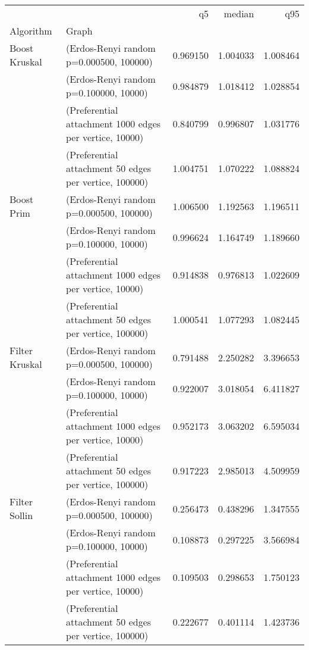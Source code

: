 \begin{tabular}{llrrr}
\toprule
                    &                                                        &        q5 &    median &       q95 \\
Algorithm & Graph &           &           &           \\
\midrule
Boost Kruskal & (Erdos-Renyi random p=0.000500, 100000) &  0.969150 &  1.004033 &  1.008464 \\
                    & (Erdos-Renyi random p=0.100000, 10000) &  0.984879 &  1.018412 &  1.028854 \\
                    & (Preferential attachment 1000 edges per vertice, 10000) &  0.840799 &  0.996807 &  1.031776 \\
                    & (Preferential attachment 50 edges per vertice, 100000) &  1.004751 &  1.070222 &  1.088824 \\
Boost Prim & (Erdos-Renyi random p=0.000500, 100000) &  1.006500 &  1.192563 &  1.196511 \\
                    & (Erdos-Renyi random p=0.100000, 10000) &  0.996624 &  1.164749 &  1.189660 \\
                    & (Preferential attachment 1000 edges per vertice, 10000) &  0.914838 &  0.976813 &  1.022609 \\
                    & (Preferential attachment 50 edges per vertice, 100000) &  1.000541 &  1.077293 &  1.082445 \\
Filter Kruskal & (Erdos-Renyi random p=0.000500, 100000) &  0.791488 &  2.250282 &  3.396653 \\
                    & (Erdos-Renyi random p=0.100000, 10000) &  0.922007 &  3.018054 &  6.411827 \\
                    & (Preferential attachment 1000 edges per vertice, 10000) &  0.952173 &  3.063202 &  6.595034 \\
                    & (Preferential attachment 50 edges per vertice, 100000) &  0.917223 &  2.985013 &  4.509959 \\
Filter Sollin & (Erdos-Renyi random p=0.000500, 100000) &  0.256473 &  0.438296 &  1.347555 \\
                    & (Erdos-Renyi random p=0.100000, 10000) &  0.108873 &  0.297225 &  3.566984 \\
                    & (Preferential attachment 1000 edges per vertice, 10000) &  0.109503 &  0.298653 &  1.750123 \\
                    & (Preferential attachment 50 edges per vertice, 100000) &  0.222677 &  0.401114 &  1.423736 \\

\end{tabular}
